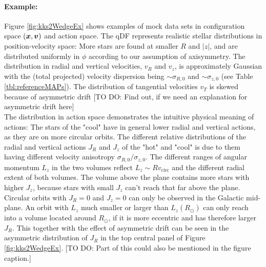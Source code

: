 
\paragraph{Example:} Figure \ref{fig:kks2WedgeEx} shows examples of mock data sets in configuration space $(\boldsymbol{x},\boldsymbol{v})$ and action space.  The qDF represents realistic stellar distributions in position-velocity space: More stars are found at smaller $R$ and $|z|$, and are distributed uniformly in $\phi$ according to our assumption of axisymmetry. The distribution in radial and vertical velocities, $v_R$ and $v_z$, is approximately Gaussian with the (total projected) velocity dispersion being $\sim\sigma_{R,0}$ and $\sim\sigma_{z,0}$ (see Table \ref{tbl:referenceMAPs}). The distribution of tangential velocities $v_T$ is skewed because of asymmetric drift [TO DO: Find out, if we need an explanation for asymmetric drift here]
\\The distribution in action space demonstrates the intuitive physical meaning of actions: The stars of the "cool" \MAP have in general lower radial and vertical actions, as they are on more circular orbits. The different relative distributions of the radial and vertical actions $J_R$ and $J_z$ of the "hot" and "cool" \MAP is due to them having different velocity anisotropy $\sigma_{R,0}/\sigma_{z,0}$. The different ranges of angular momentum $L_z$ in the two volumes reflect $L_z \sim R  v_\text{circ}$ and the different radial extent of both volumes. The volume above the plane contains more stars with higher $J_z$, because stars with small $J_z$ can't reach that far above the plane. Circular orbits with $J_R = 0$ and $J_z = 0$ can only be observed in the Galactic mid-plane. An orbit with $L_z$ much smaller or larger than $L_z(R_\odot)$ can only reach into a volume located around $R_\odot$, if it is more eccentric and has therefore larger $J_R$. This together with the effect of asymmetric drift can be seen in the asymmetric distribution of $J_R$ in the top central panel of Figure \ref{fig:kks2WedgeEx}. [TO DO: Part of this could also be mentioned in the figure caption.]






